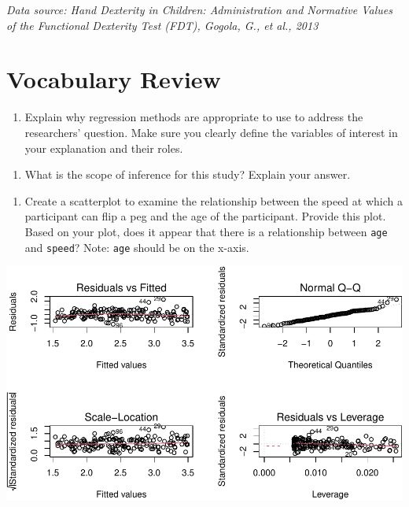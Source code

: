 \documentclass[
]{report}
\providecommand{\tightlist}{%
  \setlength{\itemsep}{0pt}\setlength{\parskip}{0pt}}
\begin{document}
\emph{Data source: Hand Dexterity in Children: Administration and Normative Values of the Functional Dexterity Test (FDT), Gogola, G., et al., 2013}

\hypertarget{vocabulary-review}{%
\section{Vocabulary Review}\label{vocabulary-review}}

\begin{enumerate}
\def\labelenumi{\arabic{enumi}.}
\tightlist
\item
  Explain why regression methods are appropriate to use to address the researchers' question. Make sure you clearly define the variables of interest in your explanation and their roles.
\end{enumerate}

\vspace{1in}

\begin{enumerate}
\def\labelenumi{\arabic{enumi}.}
\setcounter{enumi}{1}
\tightlist
\item
  What is the scope of inference for this study? Explain your answer.
\end{enumerate}

\vspace{1in}

\begin{enumerate}
\def\labelenumi{\arabic{enumi}.}
\setcounter{enumi}{2}
\tightlist
\item
  Create a scatterplot to examine the relationship between the speed at which a participant can flip a peg and the age of the participant. Provide this plot. Based on your plot, does it appear that there is a relationship between \texttt{age} and \texttt{speed}? Note: \texttt{age} should be on the x-axis.
\end{enumerate}

\begin{center}\includegraphics[width=0.7\linewidth]{10-regression_files/figure-latex/unnamed-chunk-2-1} \end{center}
\end{document}
